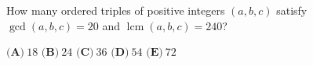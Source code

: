 How many ordered triples of positive integers $(a,b,c)$ satisfy $\gcd(a,b,c)=20$ and $\operatorname{lcm}(a,b,c)=240$?

$\textbf{(A)}\ $$18$ \qquad $\textbf{(B)}\ $$24$ \qquad $\textbf{(C)}\ $$36$ \qquad $\textbf{(D)}\ $$54$ \qquad $\textbf{(E)}\ $$72$
